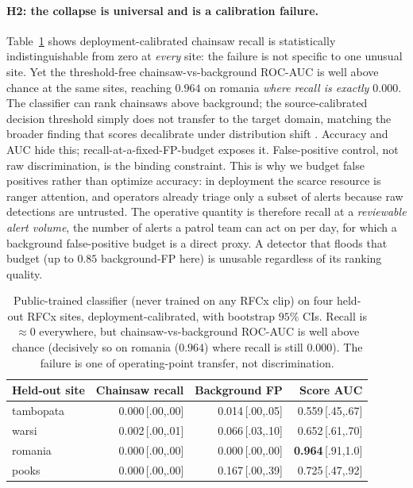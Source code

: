 \paragraph{H2: the collapse is universal and is a calibration failure.}
Table~\ref{tab:diag-multisite} shows deployment-calibrated chainsaw recall is
statistically indistinguishable from zero at \emph{every} site: the failure
is not specific to one unusual site. Yet the threshold-free
chainsaw-vs-background ROC-AUC is well above chance at the same sites, reaching
$0.964$ on romania \emph{where recall is exactly $0.000$}. The classifier can
rank chainsaws above background; the source-calibrated decision threshold simply
does not transfer to the target domain, matching the broader finding that scores
decalibrate under distribution shift \citep{snoek2019shift}. Accuracy and AUC hide this;
recall-at-a-fixed-FP-budget exposes it. False-positive control, not raw
discrimination, is the binding constraint. This is why we budget false positives
rather than optimize accuracy: in deployment the scarce resource is ranger
attention, and operators already triage only a subset of alerts because raw
detections are untrusted. The operative quantity is therefore recall at a
\emph{reviewable alert volume}, the number of alerts a patrol team can act on
per day, for which a background false-positive budget is a direct proxy. A
detector that floods that budget (up to $0.85$ background-FP here) is unusable
regardless of its ranking quality.

\begin{table}[t]
\centering
\caption{Public-trained classifier (never trained on any RFCx clip) on four
held-out RFCx sites, deployment-calibrated, with bootstrap $95\%$ CIs. Recall is
$\approx 0$ everywhere, but chainsaw-vs-background ROC-AUC is well above chance
(decisively so on romania ($0.964$) where recall is still $0.000$). The failure
is one of operating-point transfer, not discrimination.}
\label{tab:diag-multisite}
\small\setlength{\tabcolsep}{4pt}
\begin{tabular}{lrrr}
\toprule
Held-out site & Chainsaw recall & Background FP & Score AUC \\
\midrule
tambopata & 0.000\,{\footnotesize[.00,.00]} & 0.014\,{\footnotesize[.00,.05]} & 0.559\,{\footnotesize[.45,.67]} \\
warsi     & 0.002\,{\footnotesize[.00,.01]} & 0.066\,{\footnotesize[.03,.10]} & 0.652\,{\footnotesize[.61,.70]} \\
romania   & 0.000\,{\footnotesize[.00,.00]} & 0.000\,{\footnotesize[.00,.00]} & \textbf{0.964}\,{\footnotesize[.91,1.0]} \\
pooks     & 0.000\,{\footnotesize[.00,.00]} & 0.167\,{\footnotesize[.00,.39]} & 0.725\,{\footnotesize[.47,.92]} \\
\bottomrule
\end{tabular}
\end{table}

